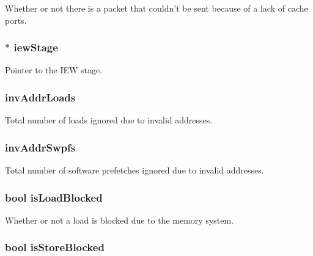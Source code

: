 \label{classLSQUnit_ae4914b6850f06ca3589fe9e75451fc2e}
Whether or not there is a packet that couldn't be sent because of a lack of cache ports. \hypertarget{classLSQUnit_a4e9ef25d8913b270d432be4bbfe4965c}{
\subsubsection[{iewStage}]{$\ast$ {\bf iewStage}}}
\label{classLSQUnit_a4e9ef25d8913b270d432be4bbfe4965c}
Pointer to the IEW stage. \hypertarget{classLSQUnit_ab1c6fb6e4b6c6a243412e594629105ea}{
\subsubsection[{invAddrLoads}]{ {\bf invAddrLoads}}}
\label{classLSQUnit_ab1c6fb6e4b6c6a243412e594629105ea}
Total number of loads ignored due to invalid addresses. \hypertarget{classLSQUnit_a893e9b5b65df5710d85f6a583504a11c}{
\subsubsection[{invAddrSwpfs}]{ {\bf invAddrSwpfs}}}
\label{classLSQUnit_a893e9b5b65df5710d85f6a583504a11c}
Total number of software prefetches ignored due to invalid addresses. \hypertarget{classLSQUnit_a95dc31b4ce3ebcb6b9d75a510b3a128c}{
\subsubsection[{isLoadBlocked}]{\setlength{\rightskip}{0pt plus 5cm}bool {\bf isLoadBlocked}}}
\label{classLSQUnit_a95dc31b4ce3ebcb6b9d75a510b3a128c}
Whether or not a load is blocked due to the memory system. \hypertarget{classLSQUnit_a89d931c74b63e0b0e7ad856fe9525ff6}{
\subsubsection[{isStoreBlocked}]{\setlength{\rightskip}{0pt plus 5cm}bool {\bf isStoreBlocked}}}
